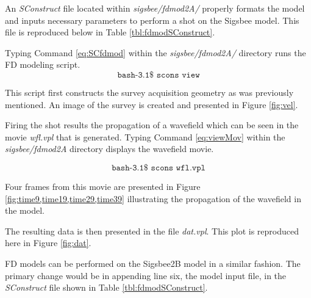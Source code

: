 An \emph{SConstruct} file located within \emph{sigsbee/fdmod2A/} properly formats the model and inputs necessary parameters to perform a shot on
the Sigsbee model.  This file is reproduced below in Table \ref{tbl:fdmodSConstruct}.

{
\tiny

\normalsize
}

Typing Command \ref{eq:SCfdmod} within the \emph{sigsbee/fdmod2A/} directory runs the FD modeling script.
\begin{equation}\label{eq:SCfdmod} \texttt{bash-3.1\$\ scons\ view} \end{equation}

This script first constructs the survey acquisition geometry as was previously mentioned.  An image of the survey is created and presented
in Figure \ref{fig:vel}.


Firing the shot results the propagation of a wavefield which can be seen in the movie \emph{wfl.vpl} that is generated.  Typing
Command \ref{eq:viewMov} within the \emph{sigsbee/fdmod2A} directory displays the wavefield movie.

\begin{equation}\label{eq:viewMov} \texttt{bash-3.1\$\ scons\ wfl.vpl} \end{equation}


Four frames from this movie are presented in Figure \ref{fig:time9,time19,time29,time39}  illustrating the
propagation of the wavefield in the model.



The resulting data is then presented in the file \emph{dat.vpl}.  This plot is reproduced here in Figure \ref{fig:dat}.  



FD models can be performed on the Sigsbee2B model in a similar fashion.  The primary change would be in appending line six, the 
model input file, in the \emph{SConstruct} file shown in Table \ref{tbl:fdmodSConstruct}.    
